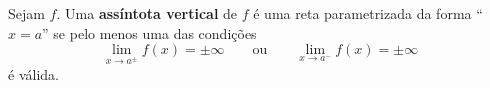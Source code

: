 \begin{definition}
	Sejam $f$. Uma \textbf{assíntota vertical} de $f$ é uma reta parametrizada da forma ``$x=a$'' se pelo menos uma das condições 
	\[\lim_{x\to a^\pm}f(x)=\pm\infty\qquad\text{ou}\qquad\lim_{x\to a^-}f(x)=\pm\infty\]
	é válida.
\end{definition}